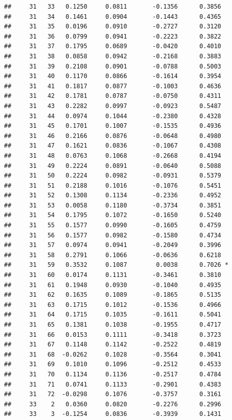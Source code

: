 \documentclass[
]{article}
\begin{document}
\begin{verbatim}
##     31   33   0.1250     0.0811       -0.1356      0.3856  
##     31   34   0.1461     0.0904       -0.1443      0.4365  
##     31   35   0.0196     0.0910       -0.2727      0.3120  
##     31   36   0.0799     0.0941       -0.2223      0.3822  
##     31   37   0.1795     0.0689       -0.0420      0.4010  
##     31   38   0.0858     0.0942       -0.2168      0.3883  
##     31   39   0.2108     0.0901       -0.0788      0.5003  
##     31   40   0.1170     0.0866       -0.1614      0.3954  
##     31   41   0.1817     0.0877       -0.1003      0.4636  
##     31   42   0.1781     0.0787       -0.0750      0.4311  
##     31   43   0.2282     0.0997       -0.0923      0.5487  
##     31   44   0.0974     0.1044       -0.2380      0.4328  
##     31   45   0.1701     0.1007       -0.1535      0.4936  
##     31   46   0.2166     0.0876       -0.0648      0.4980  
##     31   47   0.1621     0.0836       -0.1067      0.4308  
##     31   48   0.0763     0.1068       -0.2668      0.4194  
##     31   49   0.2224     0.0891       -0.0640      0.5088  
##     31   50   0.2224     0.0982       -0.0931      0.5379  
##     31   51   0.2188     0.1016       -0.1076      0.5451  
##     31   52   0.1308     0.1134       -0.2336      0.4952  
##     31   53   0.0058     0.1180       -0.3734      0.3851  
##     31   54   0.1795     0.1072       -0.1650      0.5240  
##     31   55   0.1577     0.0990       -0.1605      0.4759  
##     31   56   0.1577     0.0982       -0.1580      0.4734  
##     31   57   0.0974     0.0941       -0.2049      0.3996  
##     31   58   0.2791     0.1066       -0.0636      0.6218  
##     31   59   0.3532     0.1087        0.0038      0.7026 *
##     31   60   0.0174     0.1131       -0.3461      0.3810  
##     31   61   0.1948     0.0930       -0.1040      0.4935  
##     31   62   0.1635     0.1089       -0.1865      0.5135  
##     31   63   0.1715     0.1012       -0.1536      0.4966  
##     31   64   0.1715     0.1035       -0.1611      0.5041  
##     31   65   0.1381     0.1038       -0.1955      0.4717  
##     31   66   0.0153     0.1111       -0.3418      0.3723  
##     31   67   0.1148     0.1142       -0.2522      0.4819  
##     31   68  -0.0262     0.1028       -0.3564      0.3041  
##     31   69   0.1010     0.1096       -0.2512      0.4533  
##     31   70   0.1134     0.1136       -0.2517      0.4784  
##     31   71   0.0741     0.1133       -0.2901      0.4383  
##     31   72  -0.0298     0.1076       -0.3757      0.3161  
##     33    2   0.0360     0.0820       -0.2276      0.2996  
##     33    3  -0.1254     0.0836       -0.3939      0.1431  

\end{verbatim}
\end{document}
